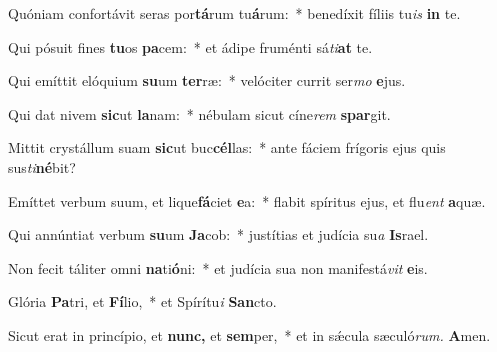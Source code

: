 \item Quóniam confortávit seras por\textbf{tá}rum tu\textbf{á}rum:~* benedíxit fíliis tu\hspace*{0.03em}\textit{is} \textbf{in} te.
\item Qui pósuit fines \textbf{tu}os \textbf{pa}cem:~* et ádipe fruménti sá\hspace*{0.03em}\textit{ti}\textbf{at} te.
\item Qui emíttit elóquium \textbf{su}um \textbf{ter}ræ:~* velóciter currit ser\hspace*{0.03em}\textit{mo} \textbf{e}jus.
\item Qui dat nivem \textbf{sic}ut \textbf{la}nam:~* nébulam sicut cíne\hspace*{0.03em}\textit{rem} \textbf{spar}git.
\item Mittit crystállum suam \textbf{sic}ut buc\textbf{cél}las:~* ante fáciem frígoris ejus quis sus\hspace*{0.01em}\textit{ti}\textbf{né}bit?
\item Emíttet verbum suum, et lique\textbf{fá}ciet \textbf{e}a:~* flabit spíritus ejus, et flu\hspace*{0.03em}\textit{ent} \textbf{a}quæ.
\item Qui annúntiat verbum \textbf{su}um \textbf{Ja}cob:~* justítias et judícia su\hspace*{0.03em}\textit{a} \textbf{Is}rael.
\item Non fecit táliter omni \textbf{na}ti\textbf{ó}ni:~* et judícia sua non manife\-stá\hspace*{0.01em}\textit{vit} \textbf{e}is.
\item Glória \textbf{Pa}tri, et \textbf{Fí}lio,~* et Spírítu\textit{i} \textbf{San}cto.
\item Sicut erat in princípio, et \textbf{nunc,} et \textbf{sem}per,~* et in sǽcula sæculó\textit{rum.} \textbf{A}men.